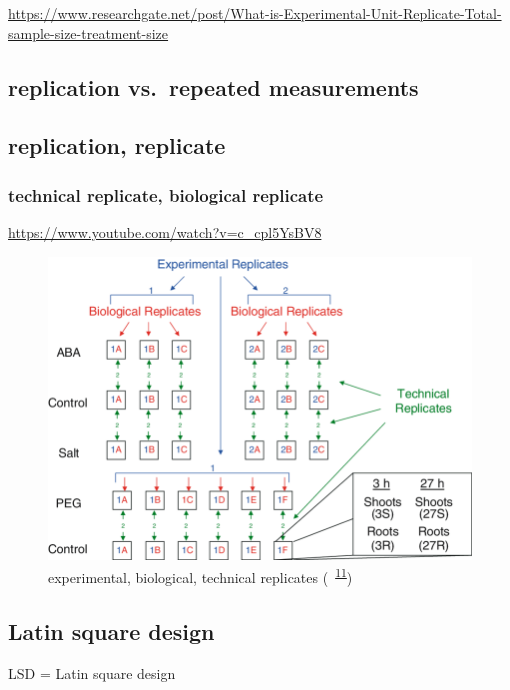 \documentclass[
]{book}
\theoremstyle{definition}
\theoremstyle{definition}
\theoremstyle{definition}
\theoremstyle{definition}
\theoremstyle{remark}
\begin{document}
\url{https://www.researchgate.net/post/What-is-Experimental-Unit-Replicate-Total-sample-size-treatment-size}

\hypertarget{replication-vs.-repeated-measurements}{%
\subsection{replication vs.~repeated measurements}\label{replication-vs.-repeated-measurements}}

\hypertarget{replication-replicate}{%
\subsection{replication, replicate}\label{replication-replicate}}

\hypertarget{technical-replicate-biological-replicate}{%
\subsubsection{technical replicate, biological replicate}\label{technical-replicate-biological-replicate}}

\url{https://www.youtube.com/watch?v=c_cpl5YsBV8}



\begin{figure}
\includegraphics[width=0.65\linewidth]{img/buchanan2005-replicates} \caption{experimental, biological, technical replicates (~\textsuperscript{\protect\hyperlink{ref-buchanan2005}{11}})}\label{fig:unnamed-chunk-1}
\end{figure}

\hypertarget{latin-square-design}{%
\subsection{Latin square design}\label{latin-square-design}}

LSD = Latin square design
\end{document}
